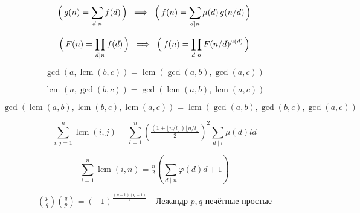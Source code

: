 \[
\Bigl(\,g(n)=\sum_{d\mid n} f(d)\,\Bigr)
\;\;\Longrightarrow\;\;
\Bigl(\,f(n)=\sum_{d\mid n}\mu(d)\,g(n/d)\,\Bigr)
\]

\[
\Bigl(\,F(n)=\prod_{d\mid n} f(d)\,\Bigr)
\;\;\Longrightarrow\;\;
\Bigl(\,f(n)=\prod_{d\mid n}F(n/d)^{\mu(d)}\,\Bigr)
\]

\[
\gcd(a,\operatorname{lcm}(b,c))=\operatorname{lcm}(\gcd(a,b),\gcd(a,c))
\]

\[
\operatorname{lcm}(a,\gcd(b,c))=\gcd(\operatorname{lcm}(a,b),\operatorname{lcm}(a,c))
\]

\[
\gcd(\operatorname{lcm}(a,b),\operatorname{lcm}(b,c),\operatorname{lcm}(a,c))
=\operatorname{lcm}(\gcd(a,b),\gcd(b,c),\gcd(a,c))
\]

\[
\sum_{i,j=1}^n \operatorname{lcm}(i,j)
=\sum_{l=1}^n\left(\tfrac{(1+\lfloor n/l\rfloor)\lfloor n/l\rfloor}{2}\right)^2 \sum_{d\mid l}\mu(d)ld
\]

\[
\sum_{i=1}^n \operatorname{lcm}(i,n)=\tfrac{n}{2}\left(\sum_{d\mid n}\varphi(d)d+1\right)
\]

\[
\left(\tfrac{p}{q}\right)\left(\tfrac{q}{p}\right)=(-1)^{\frac{(p-1)(q-1)}{4}}
\quad \text{Лежандр } p, q \text{ нечётные простые}
\]

